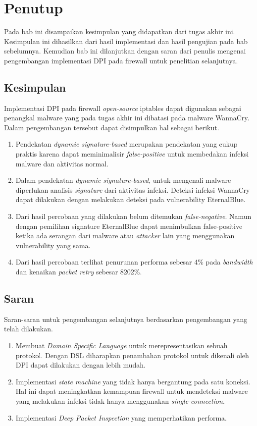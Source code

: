 \chapter{Penutup}

Pada bab ini disampaikan kesimpulan yang didapatkan dari tugas akhir ini. Kesimpulan ini dihasilkan dari hasil implementasi dan hasil pengujian pada bab sebelumnya. Kemudian bab ini dilanjutkan dengan saran dari penulis mengenai pengembangan implementasi DPI pada firewall untuk penelitian selanjutnya.

\section{Kesimpulan}

Implementasi DPI pada firewall \textit{open-source} iptables dapat digunakan sebagai penangkal malware yang pada tugas akhir ini dibatasi pada malware WannaCry. Dalam pengembangan tersebut dapat disimpulkan hal sebagai berikut.

\begin{enumerate}
	\item Pendekatan \textit{dynamic signature-based} merupakan pendekatan yang cukup praktis karena dapat meminimalisir \textit{false-positive} untuk membedakan infeksi malware dan aktivitas normal.
	\item Dalam pendekatan \textit{dynamic signature-based}, untuk mengenali malware diperlukan analisis \textit{signature} dari aktivitas infeksi. Deteksi infeksi  WannaCry dapat dilakukan dengan melakukan deteksi pada vulnerability EternalBlue.
	\item Dari hasil percobaan yang dilakukan belum ditemukan \textit{false-negative}. Namun dengan pemilihan signature EternalBlue dapat menimbulkan false-positive ketika ada serangan dari malware atau \textit{attacker} lain yang menggunakan vulnerability yang sama.
	\item Dari hasil percobaan terlihat penurunan performa sebesar 4\% pada \textit{bandwidth} dan kenaikan \textit{packet retry} sebesar 8202\%.
\end{enumerate}

\section{Saran}

Saran-saran untuk pengembangan selanjutnya berdasarkan pengembangan yang telah dilakukan.

\begin{enumerate}
	\item Membuat \textit{Domain Specific Language} untuk merepresentasikan sebuah protokol. Dengan DSL diharapkan penambahan protokol untuk dikenali oleh DPI dapat dilakukan dengan lebih mudah.
	\item Implementasi \textit{state machine} yang tidak hanya bergantung pada satu koneksi. Hal ini dapat meningkatkan kemampuan firewall untuk mendeteksi malware yang melakukan infeksi tidak hanya menggunakan \textit{single-connection}.
	\item Implementasi \textit{Deep Packet Inspection} yang memperhatikan performa.
\end{enumerate}